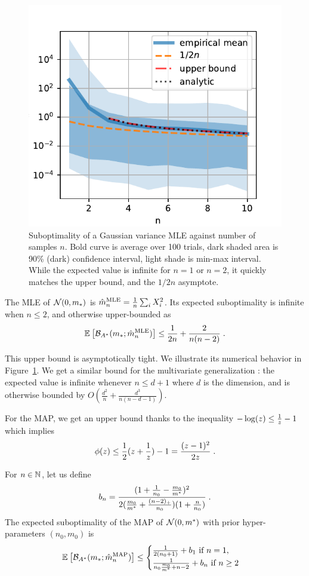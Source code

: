 \documentclass[twoside]{article}
\newcommand*{\expect}[2][]{\ensuremath{\mathbb{E}_{#1} \left[ #2 \right] }} %
\newcommand{\logpart}{A}
\newcommand{\bregmanconj}{\cB_{\logpart^*}}
\newcommand{\m}{m}
\begin{document}
\begin{figure}[ht]
	\centering
\includegraphics[width=.4\textwidth]{fewsamples.pdf}
	\caption{Suboptimality of a Gaussian variance MLE against number of samples $n$. Bold curve is average over 100 trials,  dark shaded area is 90\% (dark) confidence interval, light shade is min-max interval.
		While the expected value is infinite for $n=1$ or $n=2$, it quickly matches the upper bound, and the $1/2n$ asymptote.
	}
	\label{fig:curves}
\end{figure}


\begin{theorem}
	The MLE of $\cN(0,\m_*)$ is $\hat \m_n^\text{MLE} = \inv{n} \sum_i X_i^2 $.
	Its expected suboptimality is infinite when $n\leq 2$, and otherwise upper-bounded as
	\begin{align}
		 \expect{\bregmanconj( \m_*; \hat \m_n^\text{MLE}) }
			\leq \inv{2n} +\frac{2}{n(n-2)} \; .
			\label{eq:MLE_rate}
	\end{align}
\end{theorem}

This upper bound is asymptotically tight.
We illustrate its numerical behavior in Figure~\ref{fig:curves}.
We get a similar bound for the multivariate generalization :
the expected value is infinite whenever $n \leq d+1$ where $d$ is the dimension, and is otherwise bounded by $O(\frac{d^2}{n} + \frac{d^3}{n(n-d-1)} )$.

For the MAP, we get an upper bound thanks to the inequality $ - \log(z) \leq \frac{1}{z} - 1$ which implies
\begin{align}
	\label{eq:log_bound}
	\phi(z) \leq \frac{1}{2} (z + \frac{1}{z}) - 1 = \frac{(z-1)^2}{2 z} \; .
\end{align}

\begin{theorem}
 For $n\in \mathbb{N}$, let us  define
 \begin{align}
	b_n = \frac{(1 + \inv{n_0} - \frac{\m_0}{\m^*})^2}{2 (\frac{\m_0}{\m^*}+\frac{(n-2)_+}{n_0})(1 + \frac{n}{n_0} )} \; .
 \end{align}
The expected suboptimality of the MAP of $\cN(0,\m^*)$ with prior hyper-parameters $(n_0,\m_0)$ is
 \begin{equation}
	\expect{\bregmanconj( \m_*; \hat \m_n^\mathrm{MAP})}
	\leq \begin{cases}
		\inv{2(n_0+1)}  +  b_1 \ \text{if}\ n=1,\\
		\frac{1}{n_0 \frac{\m_0}{\m^*} +n-2} + b_n \ \text{if}\ n\geq 2
	\end{cases}
	\label{eq:MAP_rate}
\end{equation}
\end{theorem}
\end{document}
